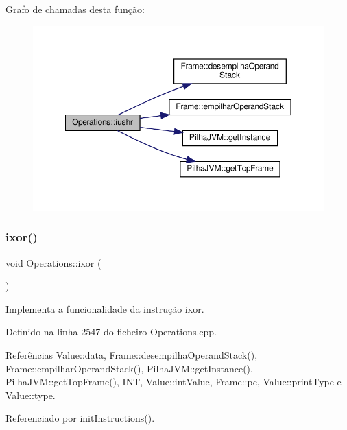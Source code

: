 Grafo de chamadas desta função\+:\nopagebreak
\begin{figure}[H]
\begin{center}
\leavevmode
\includegraphics[width=350pt]{classOperations_ae3ab5ae36e587a47832886fdf4f8b2a6_cgraph}
\end{center}
\end{figure}
\mbox{\label{classOperations_abd0ce3453623b677de3af1f05bcf4b0b}} 
\subsubsection{\texorpdfstring{ixor()}{ixor()}}
{\footnotesize\ttfamily void Operations\+::ixor (\begin{DoxyParamCaption}{ }\end{DoxyParamCaption})\hspace{0.3cm}{\ttfamily [private]}}



Implementa a funcionalidade da instrução ixor. 



Definido na linha 2547 do ficheiro Operations.\+cpp.



Referências Value\+::data, Frame\+::desempilha\+Operand\+Stack(), Frame\+::empilhar\+Operand\+Stack(), Pilha\+J\+V\+M\+::get\+Instance(), Pilha\+J\+V\+M\+::get\+Top\+Frame(), I\+NT, Value\+::int\+Value, Frame\+::pc, Value\+::print\+Type e Value\+::type.



Referenciado por init\+Instructions().

